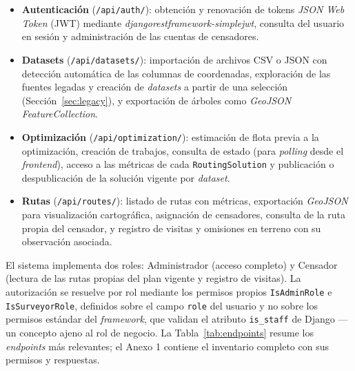 \begin{itemize}
  \item \textbf{Autenticación} (\texttt{/api/auth/}): obtención y renovación de tokens \textit{JSON Web Token} (JWT) mediante \textit{djangorestframework-simplejwt}, consulta del usuario en sesión y administración de las cuentas de censadores.
  \item \textbf{Datasets} (\texttt{/api/datasets/}): importación de archivos CSV o JSON con detección automática de las columnas de coordenadas, exploración de las fuentes legadas y creación de \textit{datasets} a partir de una selección (Sección~\ref{sec:legacy}), y exportación de árboles como \textit{GeoJSON FeatureCollection}.
  \item \textbf{Optimización} (\texttt{/api/optimization/}): estimación de flota previa a la optimización, creación de trabajos, consulta de estado (para \textit{polling} desde el \textit{frontend}), acceso a las métricas de cada \texttt{RoutingSolution} y publicación o despublicación de la solución vigente por \textit{dataset}.
  \item \textbf{Rutas} (\texttt{/api/routes/}): listado de rutas con métricas, exportación \textit{GeoJSON} para visualización cartográfica, asignación de censadores, consulta de la ruta propia del censador, y registro de visitas y omisiones en terreno con su observación asociada.
\end{itemize}

El sistema implementa dos roles: Administrador (acceso completo) y Censador
(lectura de las rutas propias del plan vigente y registro de visitas). La autorización se resuelve por rol mediante los permisos propios
\texttt{IsAdminRole} e \texttt{IsSurveyorRole}, definidos sobre el campo
\texttt{role} del usuario y no sobre los permisos estándar del \textit{framework},
que validan el atributo \texttt{is\_staff} de Django ---un concepto ajeno al rol de
negocio. La Tabla~\ref{tab:endpoints} resume los \textit{endpoints} más relevantes;
el Anexo 1 contiene el inventario completo con sus permisos y respuestas.


